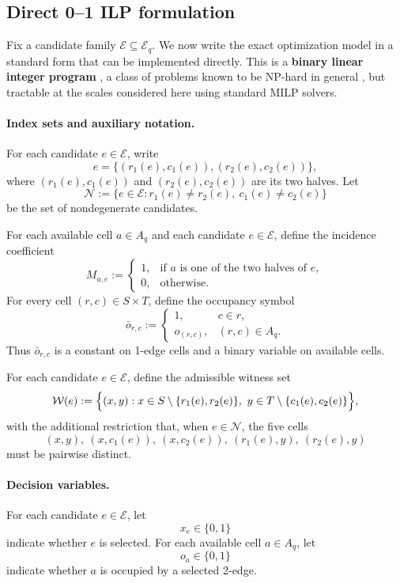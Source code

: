 \documentclass[10pt]{article}
\newcommand{\0}{\mathbf{0}}
\newcommand{\1}{\mathbf{1}}
\begin{document}
\subsection*{Direct 0--1 ILP formulation}

Fix a candidate family \(\mathcal E\subseteq \mathcal E_q\). We now write the exact optimization model in a standard form that can be implemented directly. This is a \textbf{binary linear integer program} \cite{Wol98,NW99}, a class of problems known to be NP-hard in general \cite{GJ79}, but tractable at the scales considered here using standard MILP solvers.

\paragraph{Index sets and auxiliary notation.}
For each candidate \(e\in\mathcal E\), write
\[
e=\{(r_1(e),c_1(e)),(r_2(e),c_2(e))\},
\]
where \((r_1(e),c_1(e))\) and \((r_2(e),c_2(e))\) are its two halves. Let
\[
\mathcal N:=\{e\in\mathcal E: r_1(e)\neq r_2(e),\ c_1(e)\neq c_2(e)\}
\]
be the set of nondegenerate candidates.

For each available cell \(a\in A_q\) and each candidate \(e\in\mathcal E\), define the incidence coefficient
\[
M_{a,e}:=
\begin{cases}
1, & \text{if }a\text{ is one of the two halves of }e,\\
0, & \text{otherwise.}
\end{cases}
\]
For every cell \((r,c)\in S\times T\), define the occupancy symbol
\[
\bar o_{r,c}:=
\begin{cases}
1, & c\in r,\\
o_{(r,c)}, & (r,c)\in A_q.
\end{cases}
\]
Thus \(\bar o_{r,c}\) is a constant on 1-edge cells and a binary variable on available cells.

For each candidate \(e\in\mathcal E\), define the admissible witness set
\[
\mathcal W(e):=\Bigl\{(x,y): x\in S\setminus\{r_1(e),r_2(e)\},\ y\in T\setminus\{c_1(e),c_2(e)\}\Bigr\},
\]
with the additional restriction that, when \(e\in\mathcal N\), the five cells
\[
(x,y),\ (x,c_1(e)),\ (x,c_2(e)),\ (r_1(e),y),\ (r_2(e),y)
\]
must be pairwise distinct.

\paragraph{Decision variables.}
For each candidate \(e\in\mathcal E\), let
\[
x_e\in\{0,1\}
\]
indicate whether \(e\) is selected. For each available cell \(a\in A_q\), let
\[
o_a\in\{0,1\}
\]
indicate whether \(a\) is occupied by a selected 2-edge.
\end{document}
